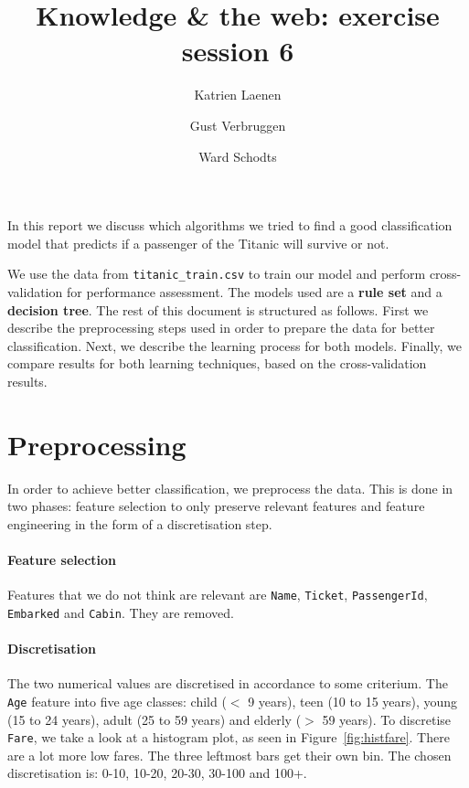 \documentclass[11pt,a4paper]{article}
\author{
  Katrien Laenen\\
  \and
  Gust Verbruggen\\
  \and
  Ward Schodts
}
\title{Knowledge \& the web: exercise session 6}
\begin{document}
\maketitle
In this report we discuss which algorithms we tried to find a good classification model that predicts if a passenger of the Titanic will survive or not.

We use the data from \texttt{titanic\_train.csv} to train our model and perform cross-validation for performance assessment. The models used are a \textbf{rule set} and a \textbf{decision tree}.  The rest of this document is structured as follows. First we describe the preprocessing steps used in order to prepare the data for better classification. Next, we describe the learning process for both models. Finally, we compare results for both learning techniques, based on the cross-validation results. 

\section{Preprocessing}
In order to achieve better classification, we preprocess the data. This is done in two phases: feature selection to only preserve relevant features and feature engineering in the form of a discretisation step.

\paragraph{Feature selection} Features that we do not think are relevant are \texttt{Name}, \texttt{Ticket}, \texttt{PassengerId}, \texttt{Embarked} and \texttt{Cabin}. They are removed.

\paragraph{Discretisation} The two numerical values are discretised in accordance to some criterium. The \texttt{Age} feature into five age classes: child ($<$ 9 years), teen (10 to 15 years), young (15 to 24 years), adult (25 to 59 years) and elderly ($>$ 59 years). To discretise \texttt{Fare}, we take a look at a histogram plot, as seen in Figure~\ref{fig:histfare}. There are a lot more low fares. The three leftmost bars get their own bin. The chosen discretisation is: 0-10, 10-20, 20-30, 30-100 and 100+.
\end{document}
